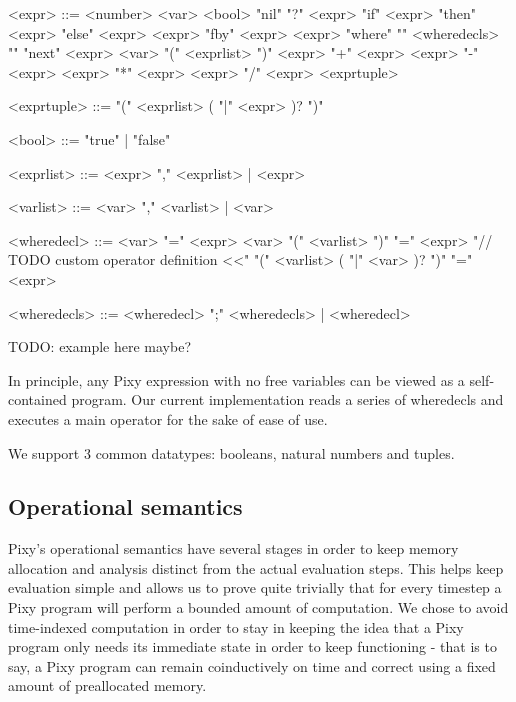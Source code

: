\documentclass{scrartcl}
\begin{document}
    \begin{grammar}
        <expr> ::= <number>
        \alt <var>
        \alt <bool>
        \alt "nil"
        \alt "?" <expr>
        \alt "if" <expr> "then" <expr> "else" <expr>
        \alt <expr> "fby" <expr>
        \alt <expr> "where" "{" <wheredecls> "}"
        \alt "next" <expr>
        \alt <var> "(" <exprlist> ")"
        \alt <expr> "+" <expr>
        \alt <expr> "-" <expr>
        \alt <expr> "*" <expr>
        \alt <expr> "/" <expr>
        \alt <exprtuple>
        
        <exprtuple> ::= "(" <exprlist> ( "|" <expr> )? ")"
        
        <bool> ::= "true" | "false"
        
        <exprlist> ::= <expr> "," <exprlist> | <expr>
        
        <varlist> ::= <var> "," <varlist> | <var>
        
        <wheredecl> ::= <var> "=" <expr> 
        \alt <var> "(" <varlist> ")" "=" <expr> "// TODO custom operator definition <<"
        \alt "(" <varlist> ( "|" <var> )? ")" "=" <expr>
        
        <wheredecls> ::= <wheredecl> ";" <wheredecls> | <wheredecl>
    \end{grammar}

    TODO: example here maybe?

    In principle, any Pixy expression with no free variables can be viewed as a self-contained program. Our current implementation reads a series of wheredecls and executes a main operator for the sake of ease of use.
    
    We support 3 common datatypes: booleans, natural numbers and tuples.
    
    \subsection{Operational semantics}
    
    Pixy's operational semantics have several stages in order to keep memory allocation and analysis distinct from the actual evaluation steps. This helps keep evaluation simple and allows us to prove quite trivially that for every timestep a Pixy program will perform a bounded amount of computation. We chose to avoid time-indexed computation in order to stay in keeping the idea that a Pixy program only needs its immediate state in order to keep functioning - that is to say, a Pixy program can remain coinductively on time and correct using a fixed amount of preallocated memory.
    
\end{document}
